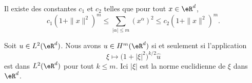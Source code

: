 \begin{lemma}
    Il existe des constantes \( c_1\) et \( c_2\) telles que pour tout \( x\in \eR^d\),
    \begin{equation}
        c_1(1+\| x \|^2)^m\leq \sum_{| \alpha |\leq m}(x^{\alpha})^2\leq c_2(1+\| x \|^2)^m.
    \end{equation}
\end{lemma}

\begin{lemma}
    Soit \( u\in L^2(\eR^d)\). Nous avons \( u\in H^m(\eR^d)\) si et seulement si l'application
    \begin{equation}
        \xi\mapsto \big( 1+| \xi |^2 \big)^{k/2}\hat u
    \end{equation}
    est dans \( L^2(\eR^d)\) pour tout \( k\leq m\). Ici \( | \xi |\) est la norme euclidienne de \( \xi\) dans \( \eR^d\).
\end{lemma}

